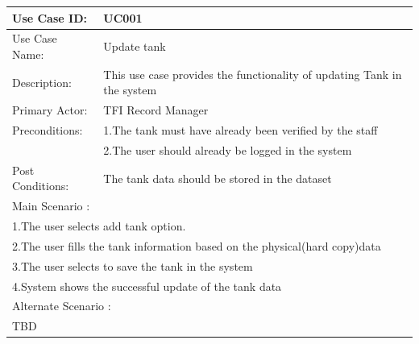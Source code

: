  \begin{center}
 \vspace*{1\baselineskip}	
 \begin{tabular}{|l|p{10cm}|}
 \hline
 Use Case ID: & UC001 \\
 \hline
 Use Case Name: & Update tank \\
 \hline
 Description: & This use case provides the functionality of updating Tank in the system \\
 \hline
 Primary Actor: & TFI Record Manager \\
 \hline
 Preconditions: & 1.The tank must have already been verified by the staff\\ 
			    & 2.The user should already be logged in the system \\
\hline
 Post Conditions: & The tank data should be stored in the dataset\\
\hline
\multicolumn{2}{|l|}{Main Scenario :} \\
\hline
\multicolumn{2}{|l|}{1.The user selects add tank option.} \\
\multicolumn{2}{|l|}{2.The user fills the tank information based on the physical(hard copy)data } \\
\multicolumn{2}{|l|}{3.The user selects to save the tank in the system} \\
\multicolumn{2}{|l|}{4.System shows the successful update of the tank data} \\
\hline
\multicolumn{2}{|l|}{Alternate Scenario :} \\
\hline
\multicolumn{2}{|l|}{TBD} \\
\hline	
\end{tabular}

\end{center}
		
